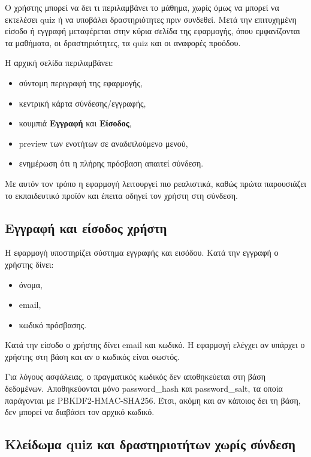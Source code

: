 \documentclass[a4paper]{article}
\newcommand{\textlatin}[1]{\textenglish{#1}}
\begin{document}
Ο χρήστης μπορεί να δει τι περιλαμβάνει το μάθημα, χωρίς όμως να μπορεί να εκτελέσει quiz ή να υποβάλει δραστηριότητες πριν συνδεθεί. Μετά την επιτυχημένη είσοδο ή εγγραφή μεταφέρεται στην κύρια σελίδα της εφαρμογής, όπου εμφανίζονται τα μαθήματα, οι δραστηριότητες, τα quiz και οι αναφορές προόδου.

Η αρχική σελίδα περιλαμβάνει:

\begin{itemize}[leftmargin=1.2cm]
  \item σύντομη περιγραφή της εφαρμογής,
  \item κεντρική κάρτα σύνδεσης/εγγραφής,
  \item κουμπιά \textbf{Εγγραφή} και \textbf{Είσοδος},
  \item preview των ενοτήτων σε αναδιπλούμενο μενού,
  \item ενημέρωση ότι η πλήρης πρόσβαση απαιτεί σύνδεση.
\end{itemize}

Με αυτόν τον τρόπο η εφαρμογή λειτουργεί πιο ρεαλιστικά, καθώς πρώτα παρουσιάζει το εκπαιδευτικό προϊόν και έπειτα οδηγεί τον χρήστη στη σύνδεση.

\subsection{Εγγραφή και είσοδος χρήστη}

Η εφαρμογή υποστηρίζει σύστημα εγγραφής και εισόδου. Κατά την εγγραφή ο χρήστης δίνει:

\begin{itemize}[leftmargin=1.2cm]
  \item όνομα,
  \item email,
  \item κωδικό πρόσβασης.
\end{itemize}

Κατά την είσοδο ο χρήστης δίνει email και κωδικό. Η εφαρμογή ελέγχει αν υπάρχει ο χρήστης στη βάση και αν ο κωδικός είναι σωστός.

Για λόγους ασφάλειας, ο πραγματικός κωδικός δεν αποθηκεύεται στη βάση δεδομένων. Αποθηκεύονται μόνο \textlatin{password\_hash} και \textlatin{password\_salt}, τα οποία παράγονται με \textlatin{PBKDF2-HMAC-SHA256}. Έτσι, ακόμη και αν κάποιος δει τη βάση, δεν μπορεί να διαβάσει τον αρχικό κωδικό.

\subsection{Κλείδωμα quiz και δραστηριοτήτων χωρίς σύνδεση}
\end{document}
